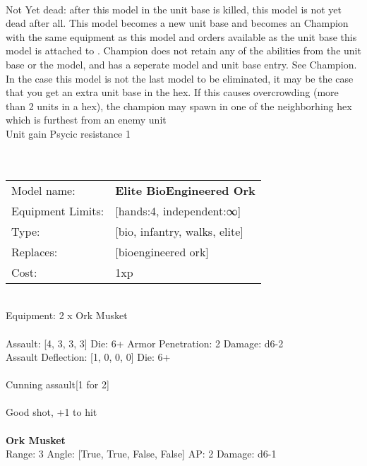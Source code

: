 \ \\
Not Yet dead: after this model in the unit base is killed, this model is not yet dead after all. This model becomes a new unit base and becomes an Champion with the same equipment as this model and orders available as the unit base this model is attached to . Champion does not retain any of the abilities from the unit base or the model, and has a seperate model and unit base entry. See Champion. In the case this model is not the last model to be eliminated, it may be the case that you get an extra unit base in the hex. If this causes overcrowding (more than 2 units in a hex), the champion may spawn in one of the neighborhing hex which is furthest from an enemy unit\\ 
Unit gain Psycic resistance 1\\ 

\ \\
 
\ \\

\noindent
\begin{tabular}{ll}
Model name: &{\bf Elite BioEngineered Ork } \\
Equipment Limits: &[hands:4, independent:∞] \\
Type: &[bio, infantry, walks, elite] \\
Replaces: &[bioengineered ork] \\
Cost: & 1xp\\
\end{tabular}
\ \\
Equipment: 2 x Ork Musket \\
\ \\
Assault: [4, 3, 3, 3] Die: 6+ Armor Penetration: 2 Damage: d6-2 \\
Assault Deflection: [1, 0, 0, 0] Die: 6+\\
\\ 
Cunning assault[1 for 2]\\ 
 
\ \\
Good shot, +1 to hit\\ 

\ \\
{\bf Ork Musket } \\



Range: 3  Angle: [True, True, False, False] AP: 2 Damage: d6-1 \\




